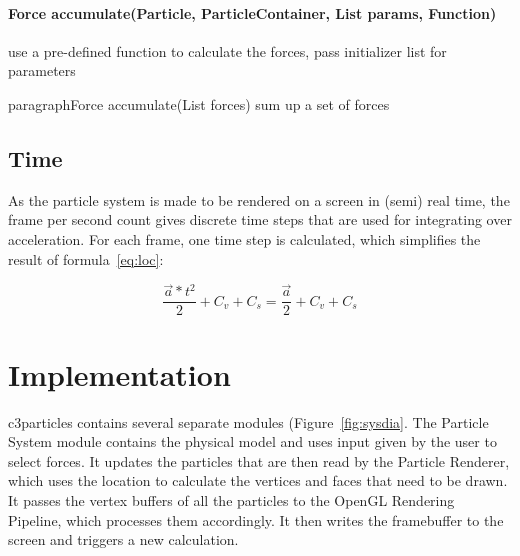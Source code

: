 \documentclass[runningheads,a4paper]{llncs}
\begin{document}
\paragraph{Force accumulate(Particle, ParticleContainer, List params, Function)}
use a pre-defined function to calculate the forces, pass initializer list for parameters

paragraph{Force accumulate(List forces)}
sum up a set of forces

\subsection{Time}
As the particle system is made to be rendered on a screen in (semi) real time, the frame per second count gives discrete time steps that are used for integrating over acceleration. For each frame, one time step is calculated, which simplifies the result of formula~\ref{eq:loc}:

\begin{equation}
\frac{\overrightarrow{a}*t^2}{2} + C_v + C_s = \frac{\overrightarrow{a}}{2} +C_v + C_s
\label{eq:simpleloc}
\end{equation}


\section{Implementation}

c3particles contains several separate modules (Figure~\ref{fig:sysdia}. The Particle System module contains the physical model and uses input given by the user to select forces. It updates the particles that are then read by the Particle Renderer, which uses the location to calculate the vertices and faces that need to be drawn. It passes the vertex buffers of all the particles to the OpenGL Rendering Pipeline, which processes them accordingly. It then writes the framebuffer to the screen and triggers a new calculation.


\end{document}
